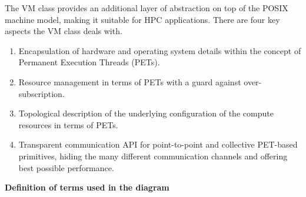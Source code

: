 

The VM class provides an additional layer of abstraction on top of the POSIX machine model, making it suitable for HPC applications. There are four key aspects the VM class deals with.

\begin{enumerate}

\item Encapsulation of hardware and operating system details within the concept of Permanent Execution Threads (PETs).

\item Resource management in terms of PETs with a guard against over-subscription.

\item Topological description of the underlying configuration of the compute resources in terms of PETs.

\item Transparent communication API for point-to-point and collective PET-based primitives, hiding the many different communication channels and offering best possible performance.

\end{enumerate}



{\bf Definition of terms used in the diagram}

